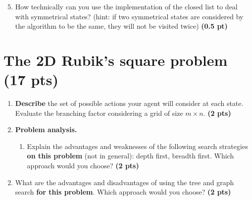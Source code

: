 \documentclass[11pt,a4paper]{report}
\begin{document}
\begin{answer}
\end{answer}



\begin{enumerate}
\setcounter{enumi}{4}
    \item How technically can you use the implementation of the closed list to deal with symmetrical states? (hint: if two symmetrical states are considered by the algorithm to be the same, they will not be visited twice) \textbf{(0.5 pt)}
\end{enumerate}

\begin{answer}
\end{answer}




\section{The 2D Rubik's square problem (17 pts)}

\begin{enumerate}
  \item \textbf{Describe} the set of possible actions your agent will consider at each state. 
  Evaluate the branching factor considering a grid of size $m\times n$. \textbf{(2 pts)}
\end{enumerate}

\begin{answer}
\end{answer}



\begin{enumerate}
\setcounter{enumi}{1}
    \item \textbf{Problem analysis.}
    \begin{enumerate}
        \item Explain the advantages and weaknesses of the following search strategies \textbf{on this problem} (not in general): depth first, breadth first. Which approach would you choose? \textbf{(2 pts)}
    \end{enumerate}
\end{enumerate}

\begin{answer}
\end{answer}



\begin{enumerate}
\setcounter{enumi}{1}
\begin{enumerate}
\setcounter{enumii}{1}
    \item What are the advantages and disadvantages of using the tree and graph search \textbf{for this problem}. Which approach would you choose? \textbf{(2 pts)}
\end{enumerate}
\end{enumerate}
\end{document}
